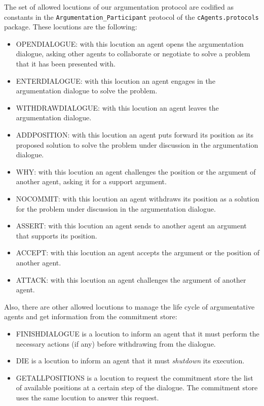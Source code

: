 The set of allowed locutions of our argumentation protocol are codified as constants in the \texttt{Argumentation\_Participant} protocol of the \lstinline{cAgents.protocols} package. These locutions are the following:
\begin{itemize}


 \item OPENDIALOGUE: with this locution an agent opens the argumentation dialogue, asking other agents to collaborate or negotiate to solve a problem that it has been presented with.
 \item ENTERDIALOGUE: with this locution an agent engages in the argumentation dialogue to solve the problem.
 \item WITHDRAWDIALOGUE: with this locution an agent leaves the argumentation dialogue.
 \item ADDPOSITION: with this locution an agent puts forward its position as its proposed solution to solve the problem under discussion in the argumentation dialogue.
 \item WHY: with this locution an agent challenges the position or the argument of another agent, asking it for a support argument.
 \item NOCOMMIT: with this locution an agent withdraws its position as a solution for the problem under discussion in the argumentation dialogue.
 \item ASSERT: with this locution an agent sends to another agent an argument that supports its position.
 \item ACCEPT: with this locution an agent accepts the argument or the position of another agent.
 \item ATTACK: with this locution an agent challenges the argument of another agent.
\end{itemize}

Also, there are other allowed locutions to manage the life cycle of argumentative agents and get information from the commitment store:
\begin{itemize}
 \item FINISHDIALOGUE is a locution to inform an agent that it must perform the necessary actions (if any) before withdrawing from the dialogue.
 \item DIE is a locution to inform an agent that it must \emph{shutdown} its execution.
 \item GETALLPOSITIONS is a locution to request the commitment store the list of available positions at a certain step of the dialogue. The commitment store uses the same locution to answer this request.
\end{itemize}

